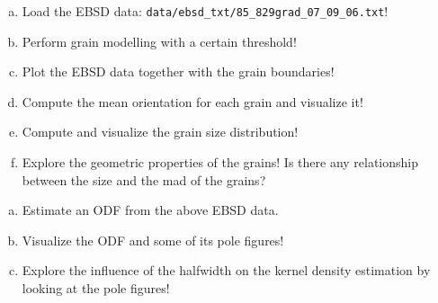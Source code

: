 \begin{frame}

  \begin{Exercise}
    \begin{enumerate}[a)]
    \item Load the EBSD data:
      \texttt{data/ebsd\_txt/85\_829grad\_07\_09\_06.txt}!
    \item Perform grain modelling with a certain threshold!
    \item Plot the EBSD data together with the grain boundaries!
    \item Compute the mean orientation for each grain and visualize it!
    \item Compute and visualize the grain size distribution!
    \item Explore the geometric properties of the grains! Is there any
      relationship between the size and the mad of the grains?
    \end{enumerate}
  \end{Exercise}

  \begin{Exercise}
    \begin{enumerate}[a)]
    \item Estimate an ODF from the above EBSD data.
    \item Visualize the ODF and some of its pole figures!
    \item Explore the influence of the halfwidth on the kernel
      density estimation by looking at the pole figures!
    \end{enumerate}
  \end{Exercise}


\end{frame}

